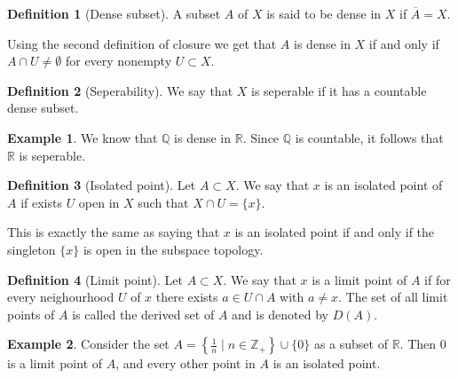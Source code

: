 \documentclass[11pt,a4paper]{article}
\theoremstyle{definition}
\newtheorem{definition}{Definition}[section]
\newtheorem{example}{Example}[section]
\theoremstyle{plain}
\newcommand{\Z}{\mathbb{Z}}
\newcommand{\Q}{\mathbb{Q}}
\newcommand{\R}{\mathbb{R}}
\newcommand{\set}[2]{ \left\{ #1 \mid #2 \right\} }
\begin{document}
  \begin{definition}[Dense subset]
    A subset $A$ of $X$ is said to be dense in $X$ if $\overline{A} = X$.
  \end{definition}

  Using the second definition of closure we get that $A$ is dense in $X$
  if and only if $A \cap U \neq \emptyset$ for every nonempty $U \subset X$.

  \begin{definition}[Seperability]
    We say that $X$ is seperable if it has a countable dense subset.
  \end{definition}

  \begin{example}
    We know that $\Q$ is dense in $\R$. Since $\Q$ is countable, it follows
    that $\R$ is seperable.
  \end{example}

  \begin{definition}[Isolated point]
    Let $A \subset X$. We say that $x$ is an isolated point of $A$ if exists
    $U$ open in $X$ such that $X \cap U = \{x\}$.
  \end{definition}

  This is exactly the same as saying that $x$ is an isolated point if and
  only if the singleton $\{x\}$ is open in the subspace topology.

  \begin{definition}[Limit point]
    Let $A \subset X$. We say that $x$ is a limit point of $A$ if for every
    neighourhood $U$ of $x$ there exists $a \in U \cap A$ with $a \neq x$.
    The set of all limit points of $A$ is called the derived set of $A$
    and is denoted by $D(A)$.
  \end{definition}

  \begin{example}
    Consider the set $A = \set{\frac{1}{n}}{n \in \Z_{+}} \cup \{0\}$ as
    a subset of $\R$. Then $0$ is a limit point of $A$, and every
    other point in $A$ is an isolated point.
  \end{example}
\end{document}

